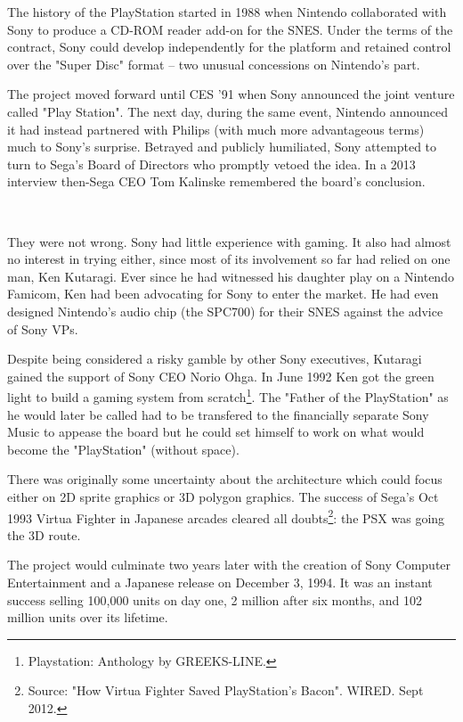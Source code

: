 \begin{figure}{
\centering {}}
\end{figure}
The history of the PlayStation started in 1988 when Nintendo collaborated with Sony to produce a CD-ROM reader add-on for the SNES. Under the terms of the contract, Sony could develop independently for the platform and retained control over the "Super Disc" format -- two unusual concessions on Nintendo's part.\\
\par
 The project moved forward until CES '91 when Sony announced the joint venture called "Play Station". The next day, during the same event, Nintendo announced it had instead partnered with Philips (with much more advantageous terms) much to Sony's surprise. Betrayed and publicly humiliated, Sony attempted to turn to Sega's Board of Directors who promptly vetoed the idea. In a 2013 interview then-Sega CEO Tom Kalinske remembered the board's conclusion.\\
\par
{}\\
\par
They were not wrong. Sony had little experience with gaming. It also had almost no interest in trying either, since most of its involvement so far had relied on one man, Ken Kutaragi. Ever since he had witnessed his daughter play on a Nintendo Famicom, Ken had been advocating for Sony to enter the market. He had even designed Nintendo's audio chip (the SPC700) for their SNES against the advice of Sony VPs.\\
\par
 Despite being considered a risky gamble by other Sony executives, Kutaragi gained the support of Sony CEO Norio Ohga. In June 1992 Ken got the green light to build a gaming system from scratch\footnote{Playstation: Anthology by GREEKS-LINE.}. The "Father of the PlayStation" as he would later be called had to be transfered to the financially separate Sony Music to appease the board but he could set himself to work on what would become the "PlayStation" (without space).\\
\par
There was originally some uncertainty about the architecture which could focus either on 2D sprite graphics or 3D polygon graphics. The success of Sega's Oct 1993 Virtua Fighter in Japanese arcades cleared all doubts\footnote{Source: "How Virtua Fighter Saved PlayStation's Bacon". WIRED. Sept 2012.}: the PSX was going the 3D route.\\
\par
The project would culminate two years later with the creation of Sony Computer Entertainment and a Japanese release on December 3, 1994. It was an instant success selling 100,000 units on day one, 2 million after six months, and 102 million units over its lifetime.\\
\par

